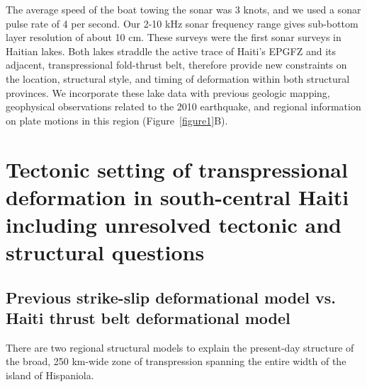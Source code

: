 \documentclass[linenumbers,draft]{agujournal}
\begin{document}
The average speed of the boat towing the sonar was 3 knots, and we used a sonar pulse rate of 4 per second. Our 2-10 kHz sonar frequency range gives sub-bottom layer resolution of about 10 cm. These surveys were the first sonar surveys in Haitian lakes. Both lakes straddle the active trace of Haiti's EPGFZ and its adjacent, transpressional fold-thrust belt, therefore provide new constraints on the location, structural style, and timing of deformation within both structural provinces. We incorporate these lake data with previous geologic mapping, geophysical observations related to the 2010 earthquake, and regional information on plate motions in this region (Figure~\ref{figure1}B). 

\section{Tectonic setting of transpressional deformation in south-central Haiti including unresolved tectonic and structural questions}
\label{sec:tectonic}
\subsection{Previous strike-slip deformational model vs. Haiti thrust belt deformational model}
There are two regional structural models to explain the present-day structure of the broad, 250 km-wide zone of transpression spanning the entire width of the island of Hispaniola.
\end{document}
